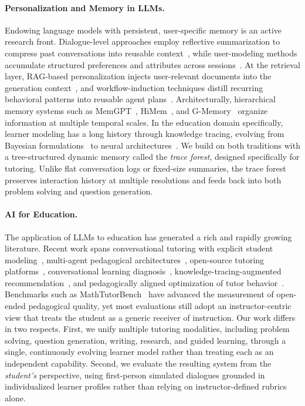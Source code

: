 \paragraph{Personalization and Memory in LLMs.}
Endowing language models with persistent, user-specific memory is an active research front.
Dialogue-level approaches employ reflective summarization to compress past conversations into reusable context~\citep{tan-etal-2025-prospect}, while user-modeling methods accumulate structured preferences and attributes across sessions~\citep{li-etal-2025-hello,cho-etal-2022-personalized}.
At the retrieval layer, RAG-based personalization injects user-relevant documents into the generation context~\citep{li2025surveypersonalizationragagent,guo2025raganythingallinoneragframework}, and workflow-induction techniques distill recurring behavioral patterns into reusable agent plans~\citep{wang2024agentworkflowmemory}.
Architecturally, hierarchical memory systems such as MemGPT~\citep{packer2023memgpt}, HiMem~\citep{qin2025himem}, and G-Memory~\citep{yang2025gmemory} organize information at multiple temporal scales.
In the education domain specifically, learner modeling has a long history through knowledge tracing, evolving from Bayesian formulations~\citep{corbett1994knowledge} to neural architectures~\citep{piech2015deep,zhang2017dkvmn,ghosh2020akt}.
We build on both traditions with a tree-structured dynamic memory called the \emph{trace forest}, designed specifically for tutoring. Unlike flat conversation logs or fixed-size summaries, the trace forest preserves interaction history at multiple resolutions and feeds back into both problem solving and question generation.

\paragraph{AI for Education.}
The application of LLMs to education has generated a rich and rapidly growing literature.
Recent work spans conversational tutoring with explicit student modeling~\citep{park2024empoweringpersonalizedlearning}, multi-agent pedagogical architectures~\citep{wang2025llmpoweredmultiagentframeworkgoaloriented}, open-source tutoring platforms~\citep{xu2025opentutorai}, conversational learning diagnosis~\citep{chen2026parld}, knowledge-tracing-augmented recommendation~\citep{liu2025tutorllm}, and pedagogically aligned optimization of tutor behavior~\citep{dinucujianu2025pedagogy}.
Benchmarks such as MathTutorBench~\citep{huang2025mathtutorbench} have advanced the measurement of open-ended pedagogical quality, yet most evaluations still adopt an instructor-centric view that treats the student as a generic receiver of instruction.
Our work differs in two respects.
First, we unify multiple tutoring modalities, including problem solving, question generation, writing, research, and guided learning, through a single, continuously evolving learner model rather than treating each as an independent capability.
Second, we evaluate the resulting system from the \emph{student's} perspective, using first-person simulated dialogues grounded in individualized learner profiles rather than relying on instructor-defined rubrics alone.
